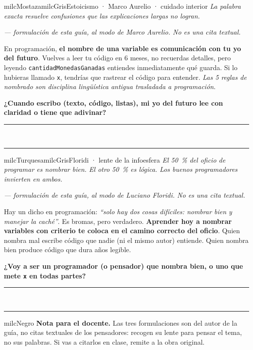 \documentclass[11pt,letterpaper]{article}
\newcommand{\linead}[1]{\noindent\color{milcLinea}\rule{#1}{0.5pt}\color{milcNegro}}
\begin{document}
\begin{softbox}{milcMostaza}{milcGris}{Estoicismo · Marco Aurelio · cuidado interior}
\textit{La palabra exacta resuelve confusiones que las explicaciones largas no logran.}

{\footnotesize\itshape\color{milcNegro!70}--- formulación de esta guía, al modo de Marco Aurelio. No es una cita textual.}

En programación, \textbf{el nombre de una variable es comunicación con tu yo del futuro}. Vuelves a leer tu código en 6 meses, no recuerdas detalles, pero leyendo \texttt{cantidadMonedasGanadas} entiendes inmediatamente qué guarda. Si lo hubieras llamado \texttt{x}, tendrías que rastrear el código para entender. \emph{Las 5 reglas de nombrado son disciplina lingüística antigua trasladada a programación}.

\textbf{¿Cuando escribo (texto, código, listas), mi yo del futuro lee con claridad o tiene que adivinar?}
\end{softbox}
\linead{\linewidth}\\[1mm]
\linead{\linewidth}

\begin{softbox}{milcTurquesa}{milcGris}{Floridi · lente de la infoesfera}
\textit{El 50~\% del oficio de programar es nombrar bien. El otro 50~\% es lógica. Los buenos programadores invierten en ambos.}

{\footnotesize\itshape\color{milcNegro!70}--- formulación de esta guía, al modo de Luciano Floridi. No es una cita textual.}

Hay un dicho en programación: \emph{``solo hay dos cosas difíciles: nombrar bien y manejar la caché''}. Es bromas, pero verdadero. \textbf{Aprender hoy a nombrar variables con criterio te coloca en el camino correcto del oficio}. Quien nombra mal escribe código que nadie (ni el mismo autor) entiende. Quien nombra bien produce código que dura años legible.

\textbf{¿Voy a ser un programador (o pensador) que nombra bien, o uno que mete \texttt{x} en todas partes?}
\end{softbox}
\linead{\linewidth}\\[1mm]
\linead{\linewidth}

\begin{infoband}{milcNegro}
\textbf{Nota para el docente.} Las tres formulaciones son del autor de la guía, no citas textuales de los pensadores: recogen su lente para pensar el tema, no sus palabras. Si vas a citarlos en clase, remite a la obra original.
\end{infoband}
\end{document}

